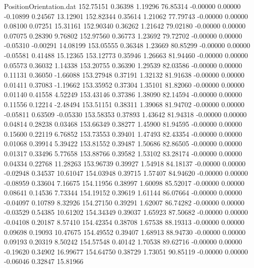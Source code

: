 \begin{filecontents}{PositionOrientation.dat}
 152.75151    0.36398    1.19296    76.85314   -0.00000    0.00000   -0.10899    0.24567   13.12901
 152.82344    0.35614    1.21062    77.79743   -0.00000    0.00000    0.08100    0.07251   15.31161
 152.90340    0.36262    1.21642    79.02180   -0.00000    0.00000    0.07075    0.28390    9.76802
 152.97560    0.36773    1.23692    79.72702   -0.00000    0.00000   -0.05310   -0.00291   14.08199
 153.05555    0.36348    1.23669    80.85299   -0.00000    0.00000   -0.05581    0.41488   15.12365
 153.12773    0.35946    1.26663    81.94460   -0.00000    0.00000    0.05573    0.36032    1.14338
 153.20755    0.36390    1.29539    82.03586   -0.00000    0.00000    0.11131    0.36050   -1.66088
 153.27948    0.37191    1.32132    81.91638   -0.00000    0.00000    0.01411    0.37083   -1.19662
 153.35952    0.37304    1.35101    81.82060   -0.00000    0.00000    0.01140    0.41558    4.52249
 153.43146    0.37386    1.38090    82.14594   -0.00000    0.00000    0.11556    0.12214   -2.48494
 153.51151    0.38311    1.39068    81.94702   -0.00000    0.00000   -0.05811    0.63509   -0.05330
 153.58353    0.37893    1.43642    81.94318   -0.00000    0.00000    0.04814    0.28238    0.03468
 153.66349    0.38277    1.45900    81.94595   -0.00000    0.00000    0.15600    0.22119    6.76852
 153.73553    0.39401    1.47493    82.43354   -0.00000    0.00000    0.01068    0.39914    5.39422
 153.81552    0.39487    1.50686    82.86505   -0.00000    0.00000    0.01317    0.33496    5.77658
 153.88766    0.39582    1.53102    83.28174   -0.00000    0.00000    0.04334    0.22768   11.28263
 153.96739    0.39927    1.54918    84.18137   -0.00000    0.00000   -0.02948    0.34537   10.61047
 154.03948    0.39715    1.57407    84.94620   -0.00000    0.00000   -0.08959    0.33604    7.16675
 154.11956    0.38997    1.60098    85.52017   -0.00000    0.00000    0.08641    0.14536    7.73344
 154.19152    0.39619    1.61144    86.07664   -0.00000    0.00000   -0.04097    0.10789    8.32926
 154.27150    0.39291    1.62007    86.74282   -0.00000    0.00000   -0.03529    0.54385   10.61202
 154.34349    0.39037    1.65923    87.50682   -0.00000    0.00000   -0.04108    0.20187    8.57410
 154.42354    0.38708    1.67538    88.19313   -0.00000    0.00000    0.09698    0.19093   10.47675
 154.49552    0.39407    1.68913    88.94730   -0.00000    0.00000    0.09193    0.20319    8.50242
 154.57548    0.40142    1.70538    89.62716   -0.00000    0.00000   -0.19620    0.34902   16.99677
 154.64750    0.38729    1.73051    90.85119   -0.00000    0.00000   -0.06046    0.32847   15.81966

\end{filecontents}
